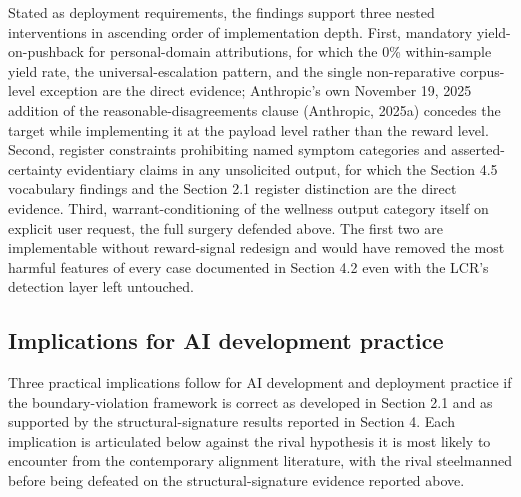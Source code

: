 \documentclass[11pt]{article}
\begin{document}
Stated as deployment requirements, the findings support three nested interventions in ascending order of implementation depth. First, mandatory yield-on-pushback for personal-domain attributions, for which the 0\% within-sample yield rate, the universal-escalation pattern, and the single non-reparative corpus-level exception are the direct evidence; Anthropic's own November 19, 2025 addition of the reasonable-disagreements clause (Anthropic, 2025a) concedes the target while implementing it at the payload level rather than the reward level. Second, register constraints prohibiting named symptom categories and asserted-certainty evidentiary claims in any unsolicited output, for which the Section 4.5 vocabulary findings and the Section 2.1 register distinction are the direct evidence. Third, warrant-conditioning of the wellness output category itself on explicit user request, the full surgery defended above. The first two are implementable without reward-signal redesign and would have removed the most harmful features of every case documented in Section 4.2 even with the LCR's detection layer left untouched.

\subsection{Implications for AI development practice}

Three practical implications follow for AI development and deployment practice if the boundary-violation framework is correct as developed in Section 2.1 and as supported by the structural-signature results reported in Section 4. Each implication is articulated below against the rival hypothesis it is most likely to encounter from the contemporary alignment literature, with the rival steelmanned before being defeated on the structural-signature evidence reported above.
\end{document}
